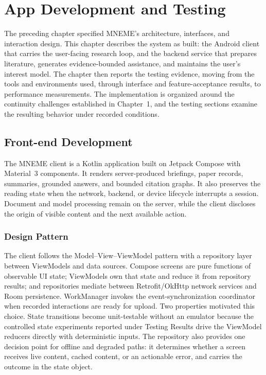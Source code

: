 
\chapter{App Development and Testing}

The preceding chapter specified MNEME's architecture, interfaces, and interaction design.
This chapter describes the system as built: the Android client that carries the user-facing research loop, and the backend service that prepares literature, generates evidence-bounded assistance, and maintains the user's interest model.
The chapter then reports the testing evidence, moving from the tools and environments used, through interface and feature-acceptance results, to performance measurements.
The implementation is organized around the continuity challenges established in Chapter~1, and the testing sections examine the resulting behavior under recorded conditions.

\section{Front-end Development}

The MNEME client is a Kotlin application built on Jetpack Compose with Material~3 components.
It renders server-produced briefings, paper records, summaries, grounded answers, and bounded citation graphs.
It also preserves the reading state when the network, backend, or device lifecycle interrupts a session.
Document and model processing remain on the server, while the client discloses the origin of visible content and the next available action.

\subsection{Design Pattern}

The client follows the Model--View--ViewModel pattern with a repository layer between ViewModels and data sources.
Compose screens are pure functions of observable UI state; ViewModels own that state and reduce it from repository results; and repositories mediate between Retrofit/OkHttp network services and Room persistence. WorkManager invokes the event-synchronization coordinator when recorded interactions are ready for upload.
Two properties motivated this choice.
State transitions become unit-testable without an emulator because the controlled state experiments reported under Testing Results drive the ViewModel reducers directly with deterministic inputs.
The repository also provides one decision point for offline and degraded paths: it determines whether a screen receives live content, cached content, or an actionable error, and carries the outcome in the state object.

